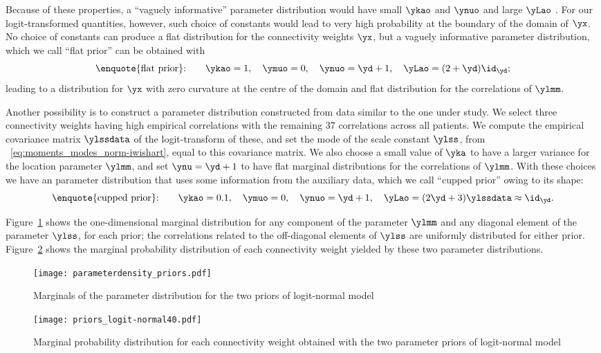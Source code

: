 Because of these properties, a \enquote{vaguely informative} parameter
distribution would have small $\ykao$ and $\ynuo$ and large $\yLao$
\citep{minka1998_r2001,murphy2007}. For our logit-transformed quantities,
however, such choice of constants would lead to very high probability at
the boundary of the domain of $\yx$. No choice of constants can produce a
flat distribution for the connectivity weights $\yx$, but a vaguely
informative parameter distribution, which we call \enquote{flat prior} can be
obtained with
\begin{equation}
  \label{eq:values_flat_prior}
\text{\enquote{flat prior}:}\qquad  \ykao=1, \quad  \ymuo=0, \quad  \ynuo=\yd+1, \quad  \yLao = (2+\yd)\id_{\yd};
\end{equation}
leading to a distribution for $\yx$ with zero curvature at the centre of the
domain and flat distribution for the correlations of $\ylmm$.

Another possibility is to construct a
parameter distribution constructed from data similar to the one under study. We
select three connectivity weights
having high empirical correlations with the remaining $37$ correlations
across all patients. We compute the empirical covariance matrix $\ylssdata$
of the logit-transform of these, and set the mode of the scale constant
$\ylss$, from \eqn~\eqref{eq:moments_modes_norm-iwishart}, equal to this
covariance matrix. We also choose a small value of $\yka$ to have a larger
variance for the location parameter $\ylmm$, and set $\ynu=\yd+1$ to have
flat marginal distributions for the correlations of $\ylmm$. With these
choices we have an parameter distribution that uses some information from the
auxiliary data, which we call \enquote{cupped prior} owing to its shape:
\begin{equation}
  \label{eq:values_cupped_prior}
\text{\enquote{cupped prior}:}\qquad  \ykao=0.1, \quad  \ymuo=0, \quad  \ynuo=\yd+1, \quad  \yLao = (2\yd +3) \ylssdata \approx \id_{\yd}.
\end{equation}

Figure~\ref{fig:priors_logit-n_parameters} shows the one-dimensional
marginal distribution for any component of the parameter $\ylmm$ and any
diagonal element of the parameter $\ylss$, for each prior; the correlations
related to the off-diagonal elements of $\ylss$ are uniformly distributed
for either prior. Figure~\ref{fig:priors_logit-n} shows the marginal
probability distribution of each connectivity weight yielded by these two
parameter distributions.
\begin{figure}[!h]
  \centering
\texttt{[image: parameterdensity\_priors.pdf]}%
\caption{Marginals of the parameter distribution for the two priors of
  logit-normal model}
\label{fig:priors_logit-n_parameters}
\end{figure}
\begin{figure}[!h]
  \centering
\texttt{[image: priors\_logit-normal40.pdf]}%
\caption{Marginal probability distribution for each connectivity weight obtained
  with the two parameter priors of logit-normal model}
\label{fig:priors_logit-n}
\end{figure}

